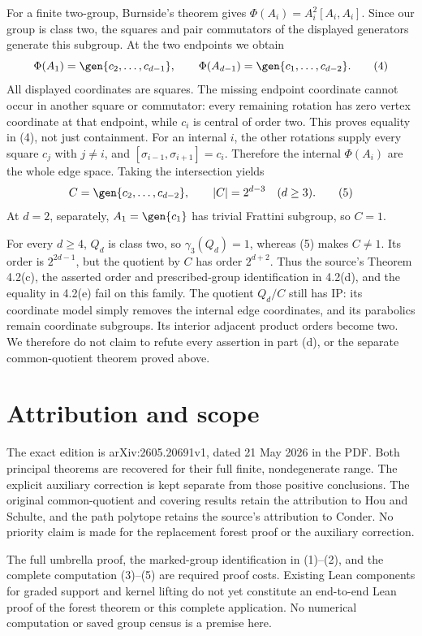 For a finite two-group, Burnside's theorem gives
$\Phi(A_i)=A_i^2[A_i,A_i]$. Since our group is class two, the squares
and pair commutators of the displayed generators generate this subgroup.
At the two endpoints we obtain
\[
 \Phi(A_1)=\gen{c_2,\ldots,c_{d-1}},\qquad
 \Phi(A_{d-1})=\gen{c_1,\ldots,c_{d-2}}.                  \tag{4}
\]
All displayed coordinates are squares. The missing endpoint coordinate
cannot occur in another square or commutator: every remaining rotation
has zero vertex coordinate at that endpoint, while $c_i$ is central of
order two. This proves equality in (4), not just containment.
For an internal $i$, the other rotations supply every square $c_j$ with
$j\ne i$, and
$[\sigma_{i-1},\sigma_{i+1}]=c_i$. Therefore the internal $\Phi(A_i)$
are the whole edge space. Taking the intersection yields
\[
 C=\gen{c_2,\ldots,c_{d-2}},\qquad |C|=2^{d-3}
       \quad(d\ge3).                                     \tag{5}
\]
At $d=2$, separately, $A_1=\gen{c_1}$ has trivial Frattini subgroup,
so $C=1$.

For every $d\ge4$, $Q_d$ is class two, so $\gamma_3(Q_d)=1$, whereas
(5) makes $C\ne1$. Its order is $2^{2d-1}$, but the quotient by $C$
has order $2^{d+2}$. Thus the source's Theorem 4.2(c), the asserted order
and prescribed-group identification in 4.2(d), and the equality in 4.2(e)
fail on this family. The quotient $Q_d/C$ still has IP: its coordinate
model simply removes the internal edge coordinates, and its parabolics
remain coordinate subgroups. Its interior adjacent product orders become
two. We therefore do not claim to refute every assertion in part (d),
or the separate common-quotient theorem proved above.

\section{Attribution and scope}
The exact edition is arXiv:2605.20691v1, dated 21 May 2026 in the PDF.
Both principal theorems are recovered for their full finite, nondegenerate
range. The explicit auxiliary correction is kept separate from those
positive conclusions. The original common-quotient and covering results
retain the attribution to Hou and Schulte, and the path polytope retains
the source's attribution to Conder. No priority claim is made for the
replacement forest proof or the auxiliary correction.

The full umbrella proof, the marked-group identification in (1)--(2), and
the complete computation (3)--(5) are required proof costs. Existing Lean
components for graded support and kernel lifting do not yet constitute an
end-to-end Lean proof of the forest theorem or this complete application.
No numerical computation or saved group census is a premise here.

